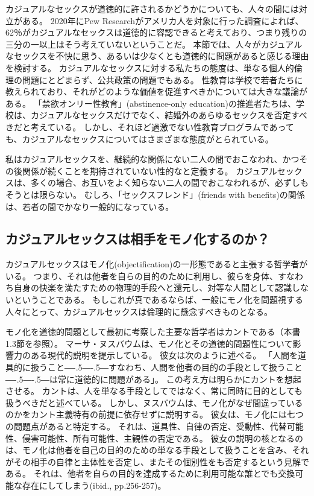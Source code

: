 \documentclass[paper=a4,book,openany]{jlreq}
\def\DDASH{―\kern-.5\zw―\kern-.5\zw―} %
\begin{document}
カジュアルなセックスが道徳的に許されるかどうかについても、人々の間には対立がある。
2020年にPew Researchがアメリカ人を対象に行った調査によれば、62％がカジュアルなセックスは道徳的に容認できると考えており、つまり残りの三分の一以上はそう考えていないということだ\citep{brow20:_near_half_u}。
本節では、人々がカジュアルなセックスを不快に思う、あるいは少なくとも道徳的に問題があると感じる理由を検討する。
カジュアルなセックスに対する私たちの態度は、単なる個人的倫理の問題にとどまらず、公共政策の問題でもある。
性教育は学校で若者たちに教えられており、それがどのような価値を促進すべきかについては大きな議論がある。
「禁欲オンリー性教育」(abstinence-only education)の推進者たちは、学校は、カジュアルなセックスだけでなく、結婚外のあらゆるセックスを否定すべきだと考えている。
しかし、それほど過激でない性教育プログラムであっても、カジュアルなセックスについてはさまざまな態度がとられている。

私はカジュアルセックスを、継続的な関係にない二人の間でおこなわれ、かつその後関係が続くことを期待されていない性的なと定義する。
カジュアルセックスは、多くの場合、お互いをよく知らない二人の間でおこなわれるが、必ずしもそうとは限らない。
むしろ、「セックスフレンド」(friends with benefits)の関係は、若者の間でかなり一般的になっている\citep{dube17:_why_frien_benef}。

\subsection{カジュアルセックスは相手をモノ化するのか？}

カジュアルセックスはモノ化(objectification)の一形態であると主張する哲学者がいる。
つまり、それは他者を自らの目的のために利用し、彼らを身体、すなわち自身の快楽を満たすための物理的手段へと還元し、対等な人間として認識しないということである。
もしこれが真であるならば、一般にモノ化を問題視する人々にとって、カジュアルセックスは倫理的に懸念すべきものとなる。

モノ化を道徳的問題として最初に考察した主要な哲学者はカントである（本書1.3節を参照）。
マーサ・ヌスバウムは、モノ化とその道徳的問題性について影響力のある現代的説明を提示している。
彼女は次のように述べる。
「人間を道具的に扱うこと{\DDASH}すなわち、人間を他者の目的の手段として扱うこと{\DDASH}は常に道徳的に問題がある」\citep[p.289]{nussbaum95:_objec}。
この考え方は明らかにカントを想起させる。
カントは、人を単なる手段としてではなく、常に同時に目的としても扱うべきだと述べている。
しかし、ヌスバウムは、モノ化がなぜ間違っているのかをカント主義特有の前提に依存せずに説明する。
彼女は、モノ化には七つの問題点があると特定する。
それは、道具性、自律の否定、受動性、代替可能性、侵害可能性、所有可能性、主観性の否定である。
彼女の説明の核となるのは、モノ化は他者を自己の目的のための単なる手段として扱うことを含み、それがその相手の自律と主体性を否定し、またその個別性をも否定するという見解である。
それは、他者を自らの目的を達成するために利用可能な誰とでも交換可能な存在にしてしまう(ibid., pp.256-257)。
\end{document}

